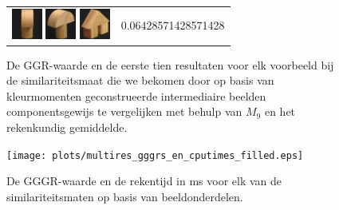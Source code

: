 {\begin{figure}[p]
\begin{tabular}{m{11cm} | m{3cm} |}
\includegraphics[width=1cm]{coil/beeld-5.eps}
\includegraphics[width=1cm]{coil/beeld-3.eps}
\includegraphics[width=1cm]{coil/beeld-45.eps}
& {\scriptsize 0.06428571428571428}
\\
\end{tabular}
\vspace{5pt}
\caption{\label{fig:results_beste_moments_pixelgeb}De GGR-waarde en de eerste tien resultaten 
voor elk voorbeeld bij de similariteitsmaat die we bekomen door op 
basis van kleurmomenten geconstrueerde intermediaire beelden componentsgewijs te vergelijken 
met behulp van $M_{9}$ en het rekenkundig gemiddelde.}
\end{figure}


\begin{figure}[p]
\centering
\texttt{[image: plots/multires\_gggrs\_en\_cputimes\_filled.eps]}
\vspace{1pt}
\caption{\label{fig:multires_gggrs_en_cputimes}De GGGR-waarde en de rekentijd in ms 
voor elk van de similariteitsmaten op basis van 
beeldonderdelen.}
\end{figure}

}
